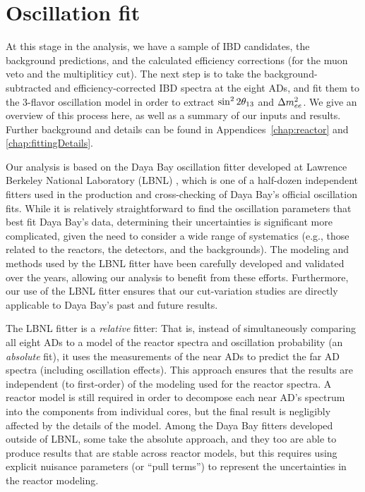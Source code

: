 \documentclass[../thesis.tex]{subfiles}
\begin{document}
\chapter{Oscillation fit}
\label{chap:fitting}

At this stage in the analysis, we have a sample of IBD candidates, the background predictions, and the calculated efficiency corrections (for the muon veto and the multipliticy cut). The next step is to take the background-subtracted and efficiency-corrected IBD spectra at the eight ADs, and fit them to the 3-flavor oscillation model in order to extract $\sin^2 2\theta_{13}$ and $\Delta m^2_{ee}$. We give an overview of this process here, as well as a summary of our inputs and results. Further background and details can be found in Appendices~\ref{chap:reactor} and \ref{chap:fittingDetails}.

Our analysis is based on the Daya Bay oscillation fitter developed at Lawrence Berkeley National Laboratory (LBNL) \cite{berkeley_shapefit,berkeley_toymc}, which is one of a half-dozen independent fitters used in the production and cross-checking of Daya Bay's official oscillation fits. While it is relatively straightforward to find the oscillation parameters that best fit Daya Bay's data, determining their uncertainties is significant more complicated, given the need to consider a wide range of systematics (e.g., those related to the reactors, the detectors, and the backgrounds). The modeling and methods used by the LBNL fitter have been carefully developed and validated over the years, allowing our analysis to benefit from these efforts. Furthermore, our use of the LBNL fitter ensures that our cut-variation studies are directly applicable to Daya Bay's past and future results.

The LBNL fitter is a \emph{relative} fitter: That is, instead of simultaneously comparing all eight ADs to a model of the reactor spectra and oscillation probability (an \emph{absolute} fit), it uses the measurements of the near ADs to predict the far AD spectra (including oscillation effects). This approach ensures that the results are independent (to first-order) of the modeling used for the reactor spectra. A reactor model is still required in order to decompose each near AD's spectrum into the components from individual cores, but the final result is negligibly affected by the details of the model. Among the Daya Bay fitters developed outside of LBNL, some take the absolute approach, and they too are able to produce results that are stable across reactor models, but this requires using explicit nuisance parameters (or ``pull terms'') to represent the uncertainties in the reactor modeling.
\end{document}
